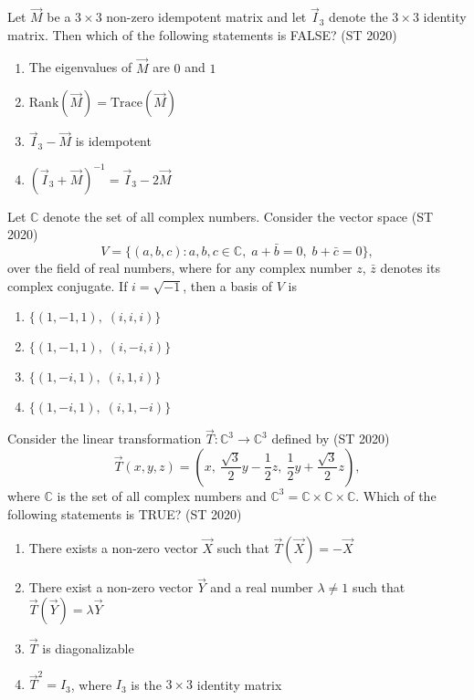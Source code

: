 \item Let $\vec{M}$ be a $3 \times 3$ non-zero idempotent matrix and let $\vec{I}_3$ denote the $3 \times 3$ identity matrix. Then which of the following statements is {FALSE}? \hfill {(ST 2020)}
\begin{enumerate}
    \item The eigenvalues of $\vec{M}$ are $0$ and $1$
    \item $\text{Rank}(\vec{M}) = \text{Trace}(\vec{M})$
    \item $\vec{I}_3 - \vec{M}$ is idempotent
    \item $(\vec{I}_3 + \vec{M})^{-1} = \vec{I}_3 - 2\vec{M}$
\end{enumerate}
\item Let $\mathbb{C}$ denote the set of all complex numbers. Consider the vector space \hfill {(ST 2020)}
\[
V = \{(a,b,c) : a,b,c \in \mathbb{C}, \; a + \bar{b} = 0, \; b + \bar{c} = 0 \},
\]
over the field of real numbers, where for any complex number $z$, $\bar{z}$ denotes its complex conjugate. If $i = \sqrt{-1}$, then a basis of $V$ is
\begin{enumerate}
    \item $\{(1,-1,1), \; (i,i,i)\}$
    \item $\{(1,-1,1), \; (i,-i,i)\}$
    \item $\{(1,-i,1), \; (i,1,i)\}$
    \item $\{(1,-i,1), \; (i,1,-i)\}$
\end{enumerate}
\item Consider the linear transformation $\vec{T}: \mathbb{C}^3 \to \mathbb{C}^3$ defined by \hfill {(ST 2020)}
\[
\vec{T}(x,y,z) = \left(x, \ \frac{\sqrt{3}}{2}y - \frac{1}{2}z, \ \frac{1}{2}y + \frac{\sqrt{3}}{2}z\right),
\]
where $\mathbb{C}$ is the set of all complex numbers and $\mathbb{C}^3 = \mathbb{C}\times \mathbb{C}\times \mathbb{C}$. Which of the following statements is TRUE?
\hfill {(ST 2020)}
\begin{enumerate}
    \item There exists a non-zero vector $\vec{X}$ such that $\vec{T}(\vec{X}) = -\vec{X}$
    \item There exist a non-zero vector $\vec{Y}$ and a real number $\lambda \neq 1$ such that $\vec{T}(\vec{Y}) = \lambda \vec{Y}$
    \item $\vec{T}$ is diagonalizable
    \item $\vec{T}^2 = I_3$, where $I_3$ is the $3 \times 3$ identity matrix
\end{enumerate}

